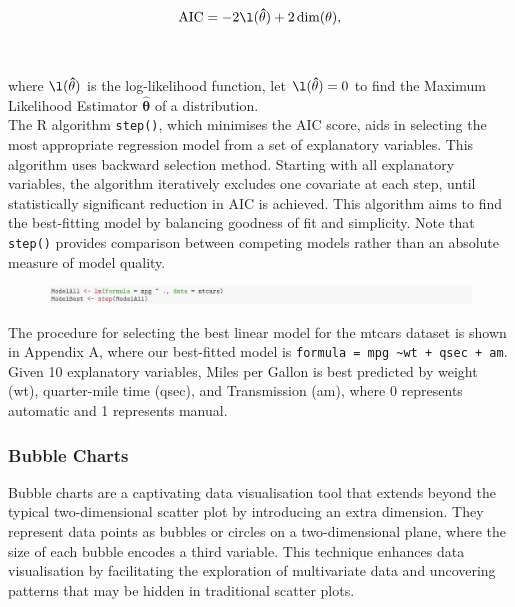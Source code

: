 \documentclass{article}\usepackage[]{graphicx}\usepackage[]{xcolor}
\begin{document}
$$\mathrm{AIC} = -2 \l(\mathbf{\hat{\theta}})+2 \dim (\mathbf{\theta}),$$
\\  
\\where $\l(\mathbf{\hat{\theta}})$ is the log-likelihood function, let $\l(\mathbf{\hat{\theta}}) = 0$ to find the Maximum Likelihood Estimator $\mathbf{\hat{\theta}}$ of a distribution.\\

\noindent 
The R algorithm \texttt{step()}, which minimises the AIC score, aids in selecting the most appropriate regression model from a set of explanatory variables. This algorithm uses backward selection method. Starting with all explanatory variables, the algorithm iteratively excludes one covariate at each step, until statistically significant reduction in AIC is achieved. This algorithm aims to find the best-fitting model by balancing goodness of fit and simplicity. Note that \texttt{step()} provides comparison between competing models rather than an absolute measure of model quality.

\begin{figure}[H]
    \centering
    \includegraphics[width=1\textwidth]{image_reference/codeshoot.png}
    \label{fig:codeshoot}
\end{figure}
\noindent
The procedure for selecting the best linear model for the mtcars dataset is shown in Appendix A, where our best-fitted model is \texttt{formula = mpg \textasciitilde wt + qsec + am}. Given 10 explanatory variables, Miles per Gallon is best predicted by weight (wt), quarter-mile time (qsec), and Transmission (am), where 0 represents automatic and 1 represents manual.\\
\noindent

\subsubsection{Bubble Charts}
Bubble charts are a captivating data visualisation tool that extends beyond the typical two-dimensional scatter plot by introducing an extra dimension. They represent data points as bubbles or circles on a two-dimensional plane, where the size of each bubble encodes a third variable. This technique enhances data visualisation by facilitating the exploration of multivariate data and uncovering patterns that may be hidden in traditional scatter plots.\\
\end{document}
